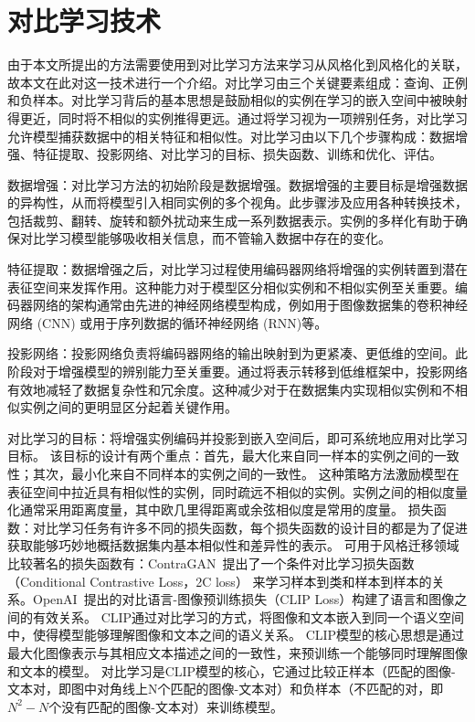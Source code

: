 \section{对比学习技术}
由于本文所提出的方法需要使用到对比学习方法来学习从风格化到风格化的关联，故本文在此对这一技术进行一个介绍。对比学习由三个关键要素组成：查询、正例和负样本。对比学习背后的基本思想是鼓励相似的实例在学习的嵌入空间中被映射得更近，同时将不相似的实例推得更远。通过将学习视为一项辨别任务，对比学习允许模型捕获数据中的相关特征和相似性。对比学习由以下几个步骤构成：数据增强、特征提取、投影网络、对比学习的目标、损失函数、训练和优化、评估。
\par 数据增强：对比学习方法的初始阶段是数据增强。数据增强的主要目标是增强数据的异构性，从而将模型引入相同实例的多个视角。此步骤涉及应用各种转换技术，包括裁剪、翻转、旋转和额外扰动来生成一系列数据表示。实例的多样化有助于确保对比学习模型能够吸收相关信息，而不管输入数据中存在的变化。
\par 特征提取：数据增强之后，对比学习过程使用编码器网络将增强的实例转置到潜在表征空间来发挥作用。这种能力对于模型区分相似实例和不相似实例至关重要。编码器网络的架构通常由先进的神经网络模型构成，例如用于图像数据集的卷积神经网络 (CNN) 或用于序列数据的循环神经网络 (RNN)等。
\par 投影网络：投影网络负责将编码器网络的输出映射到为更紧凑、更低维的空间。此阶段对于增强模型的辨别能力至关重要。通过将表示转移到低维框架中，投影网络有效地减轻了数据复杂性和冗余度。这种减少对于在数据集内实现相似实例和不相似实例之间的更明显区分起着关键作用。
\par 对比学习的目标：将增强实例编码并投影到嵌入空间后，即可系统地应用对比学习目标。
该目标的设计有两个重点：首先，最大化来自同一样本的实例之间的一致性；其次，最小化来自不同样本的实例之间的一致性。
这种策略方法激励模型在表征空间中拉近具有相似性的实例，同时疏远不相似的实例。实例之间的相似度量化通常采用距离度量，其中欧几里得距离或余弦相似度是常用的度量。
损失函数：对比学习任务有许多不同的损失函数，每个损失函数的设计目的都是为了促进获取能够巧妙地概括数据集内基本相似性和差异性的表示。
可用于风格迁移领域比较著名的损失函数有：ContraGAN~\cite{kang2020contragan}提出了一个条件对比学习损失函数（Conditional Contrastive Loss，2C loss）
来学习样本到类和样本到样本的关系。OpenAI~\cite{radford2021learning}提出的对比语言-图像预训练损失（CLIP Loss）构建了语言和图像之间的有效关系。
CLIP通过对比学习的方式，将图像和文本嵌入到同一个语义空间中，使得模型能够理解图像和文本之间的语义关系。
CLIP模型的核心思想是通过最大化图像表示与其相应文本描述之间的一致性，来预训练一个能够同时理解图像和文本的模型。
对比学习是CLIP模型的核心，它通过比较正样本（匹配的图像-文本对，即图中对角线上N个匹配的图像-文本对）和负样本（不匹配的对，即$N^2-N$个没有匹配的图像-文本对）来训练模型。
